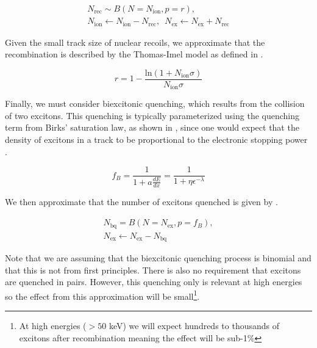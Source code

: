\begin{equation}
        \label{eqn:xe1t_nr_recombination}
        \begin{gathered}
                N_{\textrm{rec}} \sim B(N = N_{\textrm{ion}}, p = r), \\ 
                N_{\textrm{ion}} \leftarrow N_{\textrm{ion}} - N_{\textrm{rec}}, \, \, \,  N_{\textrm{ex}} \leftarrow N_{\textrm{ex}} + N_{\textrm{rec}}
        \end{gathered}
\end{equation}

Given the small track size of nuclear recoils, we approximate that the recombination is described by the Thomas-Imel model \cite{thomas1987recombination} as defined in .


\begin{equation}
        \label{eqn:xe1t_ti_model}
        r = 1 - \frac{\textrm{ln}(1 + N_{\textrm{ion}} \sigma)}{N_{\textrm{ion}} \sigma}
\end{equation}


Finally, we must consider biexcitonic quenching, which results from the collision of two excitons.  This quenching is typically parameterized using the quenching term from Birks' saturation law, as shown in , since one would expect that the density of excitons in a track to be proportional to the electronic stopping power \cite{mei2008model, tretyak2010semi, bezrukov2011interplay}. 

\begin{equation}
        \label{eqn:birks_quenching}
        f_B = \frac{1}{1 + a \frac{dE}{dx}} = \frac{1}{1 + \eta \epsilon^{- \lambda}}
\end{equation}


We then approximate that the number of excitons quenched is given by .

\begin{equation}
        \label{eqn:xe1t_biexcitonic_quenching}
        \begin{gathered}
                N_{\textrm{bq}} = B(N=N_{\textrm{ex}}, p = f_B), \\
                N_{\textrm{ex}} \leftarrow N_{\textrm{ex}} - N_{\textrm{bq}}
        \end{gathered}
\end{equation}


Note that we are assuming that the biexcitonic quenching process is binomial and that this is not from first principles.  There is also no requirement that excitons are quenched in pairs.  However, this quenching only is relevant at high energies so the effect from this approximation will be small\footnote{At high energies ($> 50$ keV) we will expect hundreds to thousands of excitons after recombination meaning the effect will be sub-1\%}.


